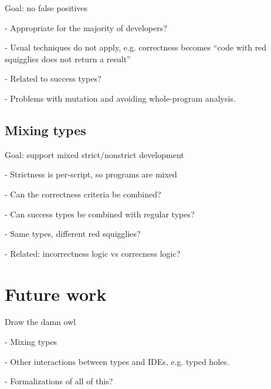 \documentclass[acmsmall]{acmart}
\begin{document}
Goal: no false positives

- Appropriate for the majority of developers?

- Usual techniques do not apply, e.g. correctness becomes ``code with red squigglies does not return a result''

- Related to success types?

- Problems with mutation and avoiding whole-program analysis.

\subsection{Mixing types}

Goal: support mixed strict/nonstrict development

- Strictness is per-script, so programs are mixed

- Can the correctness criteria be combined?

- Can success types be combined with regular types?

- Same types, different red squigglies?

- Related: incorrectness logic vs correcness logic?

\section{Future work}

Draw the damn owl

- Mixing types

- Other interactions between types and IDEs, e.g. typed holes.

- Formalizations of all of this?

 
\end{document}

